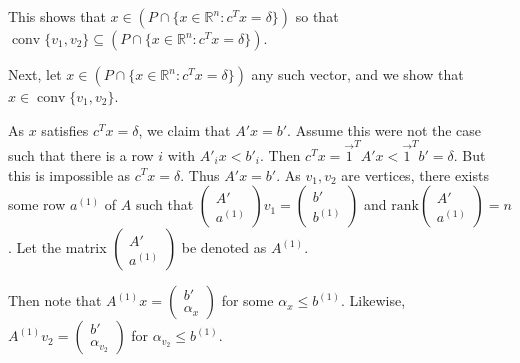 \documentclass[11pt]{article}
\DeclareMathOperator{\conv}{conv}
\newcommand{\setR}{\mathbb{R}}
\renewcommand{\leq}{\leqslant}
\newcommand{\rank}{\mathrm{rank}}
\begin{document}
\begin{enumerate}[1)]
\begin{solution}
This shows that $x \in (P \cap \{x \in \setR^n: c^Tx = \delta\})$ so that $ \conv\{v_1, v_2\} \subseteq (P \cap \{x \in \setR^n: c^Tx = \delta\})$. 


Next, let $x \in  (P \cap \{x \in \setR^n: c^Tx = \delta\})$ any such vector, and we show that $x \in  \conv\{v_1, v_2\}$. 

As $x$ satisfies $c^Tx = \delta$, we claim that $A'x = b'$. Assume this were not the case such that there is a row $i$ with $A'_i x < b'_i$. Then $c^Tx = \vec{1}^T A' x < \vec{1}^T b' = \delta$. But this is impossible as $c^Tx = \delta$. Thus $A'x = b'$. As $v_1, v_2$ are vertices, there exists some row $a^{(1)}$ of $A$ such that $\begin{pmatrix} A' \\ a^{(1)} \end{pmatrix} v_1 = \begin{pmatrix} b' \\ b^{(1)} \end{pmatrix}$ and $\rank \begin{pmatrix} A' \\ a^{(1)}\end{pmatrix} = n$. Let the matrix $\begin{pmatrix} A' \\ a^{(1)} \end{pmatrix}$ be denoted as $A^{(1)}$. 

Then note that $ A^{(1)} x =  \begin{pmatrix} b' \\ \alpha_x\end{pmatrix}$ for some $\alpha_x \leq b^{(1)}$. Likewise,  $ A^{(1)} v_2=  \begin{pmatrix} b' \\ \alpha_{v_2}\end{pmatrix}$ for $\alpha_{v_2} \leq b^{(1)}$. 


\end{solution}
\end{enumerate}
\end{document}
